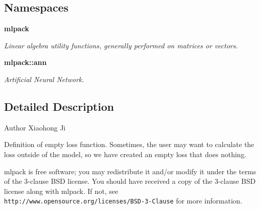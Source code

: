 \subsection*{Namespaces}
\begin{DoxyCompactItemize}
\item 
 \textbf{ mlpack}
\begin{DoxyCompactList}\small\item\em Linear algebra utility functions, generally performed on matrices or vectors. \end{DoxyCompactList}\item 
 \textbf{ mlpack\+::ann}
\begin{DoxyCompactList}\small\item\em Artificial Neural Network. \end{DoxyCompactList}\end{DoxyCompactItemize}


\subsection{Detailed Description}
\begin{DoxyAuthor}{Author}
Xiaohong Ji
\end{DoxyAuthor}
Definition of empty loss function. Sometimes, the user may want to calculate the loss outside of the model, so we have created an empty loss that does nothing.

mlpack is free software; you may redistribute it and/or modify it under the terms of the 3-\/clause B\+SD license. You should have received a copy of the 3-\/clause B\+SD license along with mlpack. If not, see {\tt http\+://www.\+opensource.\+org/licenses/\+B\+S\+D-\/3-\/\+Clause} for more information. 